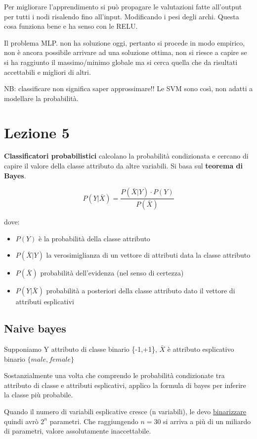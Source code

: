 Per migliorare l'apprendimento si pu\`o propagare le valutazioni fatte all'output per tutti i nodi risalendo fino all'input. Modificando i pesi degli archi. Questa cosa funziona bene e ha senso con le RELU.

Il problema MLP. non ha soluzione oggi, pertanto si procede in modo empirico, non \`e ancora possibile arrivare ad una soluzione ottima, non si riesce a capire se si ha raggiunto il massimo/minimo globale ma si cerca quella che da risultati accettabili e migliori di altri. 

NB: classificare non significa saper approssimare!! Le SVM sono cos\`i, non adatti a modellare la probabilit\`a.

\section{Lezione 5}

\textbf{Classificatori probabilistici} calcolano la probabilit\`a condizionata e cercano di capire il valore della classe attributo da altre variabili. Si basa sul \textbf{teorema di Bayes}. 

\[P(Y|\bar{X}) = \frac{P(\bar{X}|Y) \cdot P(Y)}{P(\bar{X})}\]

dove:
\begin{itemize}
	\item $P(Y)$ è la probabilit\`a della classe attributo
	\item $P(\bar{X}|Y)$ la verosimiglianza di un vettore di attributi data la classe attributo
	\item $P(\bar{X})$ probabilit\`a dell'evidenza (nel senso di certezza)
	\item $P(Y|\bar{X})$ probabilit\`a a posteriori della classe attributo dato il vettore di attributi esplicativi
\end{itemize}
\subsection{Naive bayes}
Supponiamo Y attributo di classe binario \{-1,+1\}, $\bar{X}$ \`e attributo esplicativo binario $\{male, female\}$

Sostanzialmente una volta che comprendo le probabilit\`a condizionate tra attributo di classe e attributi esplicativi, applico la formula di bayes per inferire la classe pi\`u probabile. 

Quando il numero di variabili esplicative cresce (n variabili), le devo \underline{binarizzare} quindi avr\`o $2^n$ parametri. Che raggiungendo $n=30$ si arriva a pi\`u di un miliardo di parametri, valore assolutamente inaccettabile.

